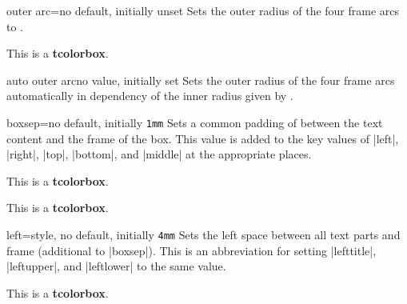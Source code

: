 \begin{docTcbKey}{outer arc}{=}{no default, initially unset}
  Sets the outer radius of the four frame arcs to .
\begin{dispExample}

\begin{tcolorbox}[arc=4mm,outer arc=1mm]
This is a \textbf{tcolorbox}.
\end{tcolorbox}
\end{dispExample}
\end{docTcbKey}


\begin{docTcbKey}{auto outer arc}{}{no value, initially set}
  Sets the outer radius of the four frame arcs automatically in
  dependency of the inner radius given by .
\end{docTcbKey}


\begin{docTcbKey}{boxsep}{=}{no default, initially \texttt{1mm}}
  Sets a common padding of  between the text content and the
  frame of the box. This value is added to the key values of
  |left|, |right|, |top|, |bottom|, and |middle| at the appropriate places.
\begin{dispExample}

\begin{tcolorbox}[boxsep=5mm]
This is a \textbf{tcolorbox}.
\end{tcolorbox}
\begin{tcolorbox}[boxsep=5mm,draft]
This is a \textbf{tcolorbox}.
\end{tcolorbox}
\end{dispExample}
\end{docTcbKey}


\clearpage
\begin{docTcbKey}{left}{=}{style, no default, initially \texttt{4mm}}
  Sets the left space between all text parts and frame (additional to |boxsep|).
  This is an abbreviation for setting
  |lefttitle|, |leftupper|, and |leftlower| to the same value.
\begin{dispExample}

\begin{tcolorbox}[left=0mm]
This is a \textbf{tcolorbox}.
\end{tcolorbox}
\end{dispExample}
\end{docTcbKey}

